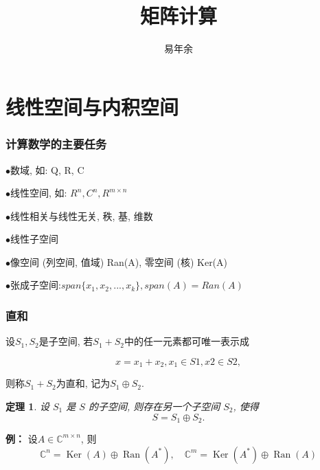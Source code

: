 \documentclass[notheorems,serif]{beamer}
\newcommand{\hei}[1]{{\HEI#1}}
\newtheorem{theorem}{\hei{定理}}
\begin{document}
\title[数值线性代数]{{\small{}~~~~~~~~~~~~~~~~~~~~~~~~~~~~~~~~~~~~~~~~~~~~~~
~~~~~~~~~~~} \\
矩阵计算
}




\author[]{~~易年余~~}

\institute[湘潭大学数学系]

\date[\today]




\frame[plain]{\titlepage}


\section{线性空间与内积空间}
\begin{frame}
\frametitle{计算数学的主要任务}
$\bullet$数域, 如: Q, R, C

$\bullet$线性空间, 如: $R^n,C^n,R^{m \times n}$

$\bullet$线性相关与线性无关, 秩, 基, 维数

$\bullet$线性子空间

$\bullet$像空间 (列空间, 值域) Ran(A), 零空间 (核) Ker(A)

$\bullet$张成子空间:$span\{x_1, x_2, . . . , x_k\}, span(A) = Ran(A)$
\end{frame}
\begin{frame}
\frametitle{直和}
设$S_1, S_2$是子空间, 若$S_1 + S_2$中的任一元素都可唯一表示成

$$x = x_1 + x_2, x_1 \in S1, x2 \in S2,$$

则称$S_1 + S_2$为直和, 记为$S_1 \oplus S_2$.


\begin{theorem}
	
	设 $S_1$ 是 $S$ 的子空间, 则存在另一个子空间 $S_2$, 使得$$S = S_1 \oplus S_2.$$
	
\end{theorem}

{\bfseries  例：} \quad 设$A \in \mathbb{C}^{m \times n}$, 则
$$\mathbb{C}^{n}=\operatorname{Ker}(A) \oplus \operatorname{Ran}\left(A^{*}\right), \quad \mathbb{C}^{m}=\operatorname{Ker}\left(A^{*}\right) \oplus \operatorname{Ran}(A)$$ 
\end{frame}
\end{document}
